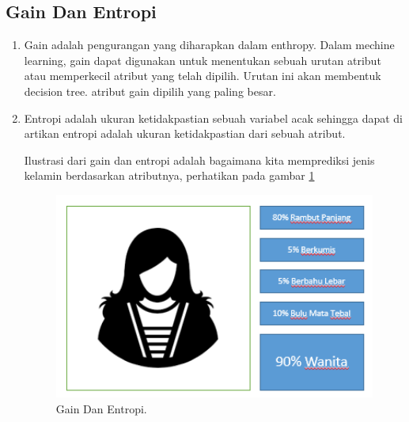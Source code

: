 \subsection{Gain Dan Entropi}
\begin{enumerate}
\item Gain adalah pengurangan yang diharapkan dalam enthropy. Dalam mechine learning, gain dapat digunakan untuk menentukan sebuah urutan atribut atau memperkecil atribut yang telah dipilih. Urutan ini akan membentuk decision tree. atribut gain dipilih yang paling besar.

\item Entropi adalah ukuran ketidakpastian sebuah variabel acak sehingga dapat di artikan entropi adalah ukuran ketidakpastian dari sebuah atribut.

\subitem Ilustrasi dari gain dan entropi adalah bagaimana kita memprediksi jenis kelamin berdasarkan atributnya, perhatikan pada gambar \ref{YNGE}

		\begin{figure}[ht]
		\centerline{\includegraphics[width=1\textwidth]{figures/YN/YN57.png}}
		\caption{Gain Dan Entropi.}
		\label{YNGE}
		\end{figure}
\end{enumerate}
